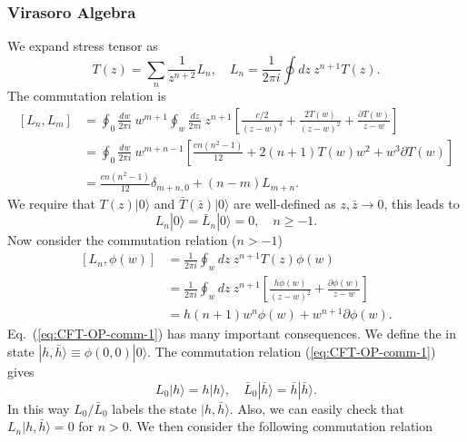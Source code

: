 \documentclass[aps,prb,superscriptaddress,nofootinbib]{revtex4}
\begin{document}
\subsubsection{Virasoro Algebra}
We expand stress tensor as
\begin{equation}
	T(z) = \sum_n \frac{1}{z^{n+2}} L_n, \quad
	L_n = \frac{1}{2\pi i}\oint dz\ z^{n+1} T(z).
\end{equation}
The commutation relation is
\begin{equation}
\begin{aligned}
	\left[L_n, L_m\right]
	&= \oint_0 \frac{dw}{2\pi i}\ w^{m+1}\oint_w \frac{dz}{2\pi i}\ z^{n+1} \left[\frac{c/2}{(z-w)^4} + \frac{2T(w)}{(z-w)^2} + \frac{\partial T(w)}{z-w}\right] \\
	&= \oint_0 \frac{dw}{2\pi i}\ w^{m+n-1}\left[\frac{cn(n^2-1)}{12} + 2(n+1)T(w)w^2 + w^3 \partial T(w) \right] \\
	&= \frac{cn(n^2-1)}{12} \delta_{m+n,0} + (n-m) L_{m+n}.
\end{aligned}
\end{equation}
We require that $T(z)|0\rangle$ and $\bar T(\bar z)|0\rangle$ are well-defined as $z,\bar z \rightarrow 0$, this leads to 
\begin{equation}
	L_n|0\rangle = \bar L_n|0\rangle = 0, \quad n \ge -1.
\end{equation}
Now consider the commutation relation ($n > -1$)
\begin{equation}\label{eq:CFT-OP-comm-1}
\begin{aligned}
	{\left[L_{n}, \phi(w)\right] } &=\frac{1}{2 \pi i} \oint_{w} d z\ z^{n+1} T(z) \phi(w) \\
	&=\frac{1}{2 \pi i} \oint_{w} d z\ z^{n+1}\left[\frac{h \phi(w)}{(z-w)^{2}}+\frac{\partial \phi(w)}{z-w}\right] \\
	&=h(n+1) w^{n} \phi(w)+w^{n+1} \partial \phi(w).
\end{aligned}
\end{equation}
Eq.~(\ref{eq:CFT-OP-comm-1}) has many important consequences. 
We define the in state $|h,\bar h\rangle \equiv \phi(0,0)|0\rangle$.
The commutation relation (\ref{eq:CFT-OP-comm-1}) gives
\begin{equation}
	L_0 |h\rangle = h|h\rangle, \quad 
	\bar L_0 |\bar h\rangle = \bar h |\bar h\rangle.
\end{equation}
In this way $L_0/\bar L_0$ labels the state $|h,\bar h\rangle$.
Also, we can easily check that $L_n|h,\bar h\rangle = 0$ for $n>0$.
We then consider the following commutation relation 
\end{document}
